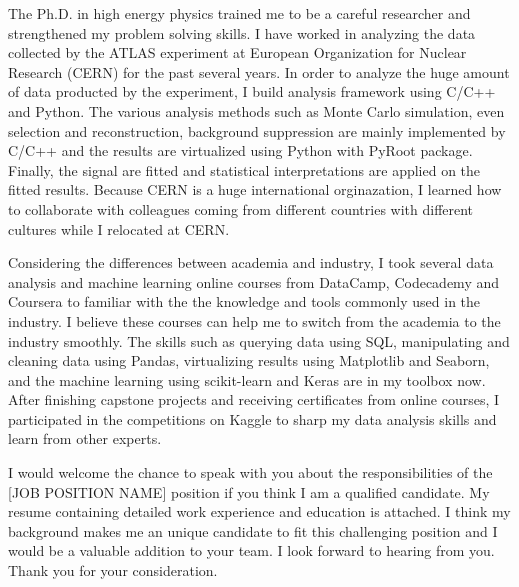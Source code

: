\documentclass[11pt,letterpaper]{moderncv}   %
\begin{document}
The Ph.D. in high energy physics trained me to be a careful researcher and strengthened my problem solving skills.
I have worked in analyzing the data collected by the ATLAS experiment at European Organization for Nuclear Research (CERN) for the past several years.
In order to analyze the huge amount of data producted by the experiment, I build analysis framework using C/C++ and Python.
The various analysis methods such as Monte Carlo simulation, even selection and reconstruction, background suppression are mainly implemented by C/C++ and the results are virtualized using Python with PyRoot package.
Finally, the signal are fitted and statistical interpretations are applied on the fitted results.
Because CERN is a huge international orginazation, I learned how to collaborate with colleagues coming from different countries with different cultures while I relocated at CERN.
 

Considering the differences between academia and industry, I took several data analysis and machine learning online courses from DataCamp, Codecademy and Coursera to familiar with the the knowledge and tools commonly used in the industry.
I believe these courses can help me to switch from the academia to the industry smoothly.
The skills such as querying data using SQL, manipulating and cleaning data using Pandas, virtualizing results using Matplotlib and Seaborn, and the machine learning using scikit-learn and Keras are in my toolbox now.
After finishing capstone projects and receiving certificates from online courses, I participated in the competitions on Kaggle to sharp my data analysis skills and learn from other experts.


I would welcome the chance to speak with you about the responsibilities of the [JOB POSITION NAME] position if you think I am a qualified candidate.
My resume containing detailed work experience and education is attached.
I think my background makes me an unique candidate to fit this challenging position and I would be a valuable addition to your team.
I look forward to hearing from you.
Thank you for your consideration.


\vspace{0.3cm}

\makeletterclosing
\end{document}
